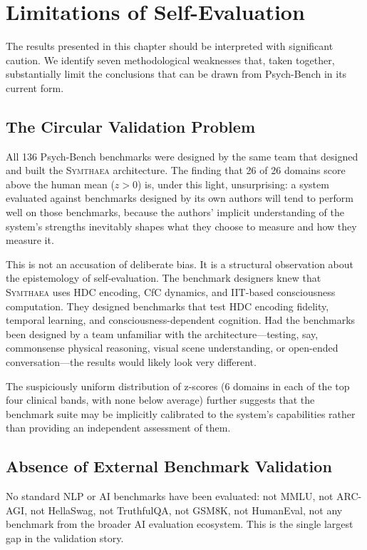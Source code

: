 \documentclass[12pt]{book}
\newcommand{\symthaea}{\textsc{Symthaea}}
\begin{document}
\section{Limitations of Self-Evaluation}
\label{sec:self-eval-limitations}

The results presented in this chapter should be interpreted with significant caution. We identify seven methodological weaknesses that, taken together, substantially limit the conclusions that can be drawn from Psych-Bench in its current form.

\subsection{The Circular Validation Problem}

All 136 Psych-Bench benchmarks were designed by the same team that designed and built the \symthaea{} architecture. The finding that 26 of 26 domains score above the human mean ($z > 0$) is, under this light, unsurprising: a system evaluated against benchmarks designed by its own authors will tend to perform well on those benchmarks, because the authors' implicit understanding of the system's strengths inevitably shapes what they choose to measure and how they measure it.

This is not an accusation of deliberate bias. It is a structural observation about the epistemology of self-evaluation. The benchmark designers knew that \symthaea{} uses HDC encoding, CfC dynamics, and IIT-based consciousness computation. They designed benchmarks that test HDC encoding fidelity, temporal learning, and consciousness-dependent cognition. Had the benchmarks been designed by a team unfamiliar with the architecture---testing, say, commonsense physical reasoning, visual scene understanding, or open-ended conversation---the results would likely look very different.

The suspiciously uniform distribution of z-scores (6 domains in each of the top four clinical bands, with none below average) further suggests that the benchmark suite may be implicitly calibrated to the system's capabilities rather than providing an independent assessment of them.

\subsection{Absence of External Benchmark Validation}

No standard NLP or AI benchmarks have been evaluated: not MMLU, not ARC-AGI, not HellaSwag, not TruthfulQA, not GSM8K, not HumanEval, not any benchmark from the broader AI evaluation ecosystem. This is the single largest gap in the validation story.
\end{document}
